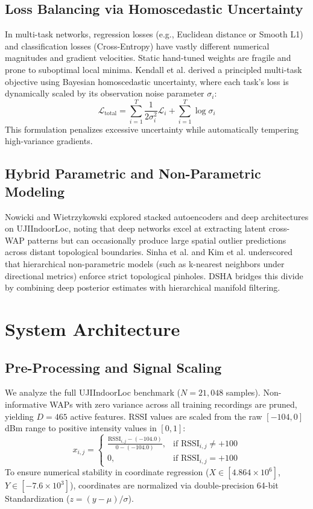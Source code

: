 \documentclass[conference]{IEEEtran}
\begin{document}
\subsection{Loss Balancing via Homoscedastic Uncertainty}
In multi-task networks, regression losses (e.g., Euclidean distance or Smooth L1) and classification losses (Cross-Entropy) have vastly different numerical magnitudes and gradient velocities. Static hand-tuned weights are fragile and prone to suboptimal local minima. Kendall et al. \cite{kendall2018} derived a principled multi-task objective using Bayesian homoscedastic uncertainty, where each task's loss is dynamically scaled by its observation noise parameter $\sigma_i$:
\begin{equation}
\mathcal{L}_{\text{total}} = \sum_{i=1}^{T} \frac{1}{2\sigma_i^2}\mathcal{L}_i + \sum_{i=1}^{T} \log \sigma_i
\end{equation}
This formulation penalizes excessive uncertainty while automatically tempering high-variance gradients.

\subsection{Hybrid Parametric and Non-Parametric Modeling}
Nowicki and Wietrzykowski \cite{nowicki2017} explored stacked autoencoders and deep architectures on UJIIndoorLoc, noting that deep networks excel at extracting latent cross-WAP patterns but can occasionally produce large spatial outlier predictions across distant topological boundaries. Sinha et al. \cite{sinha2022} and Kim et al. \cite{kim2018} underscored that hierarchical non-parametric models (such as k-nearest neighbors under directional metrics) enforce strict topological pinholes. DSHA bridges this divide by combining deep posterior estimates with hierarchical manifold filtering.

\section{System Architecture}

\subsection{Pre-Processing and Signal Scaling}
We analyze the full UJIIndoorLoc benchmark ($N=21,048$ samples). Non-informative WAPs with zero variance across all training recordings are pruned, yielding $D=465$ active features. RSSI values are scaled from the raw $[ -104, 0 ]$\,dBm range to positive intensity values in $[0, 1]$:
\begin{equation}
x_{i,j} = \begin{cases} 
\frac{\text{RSSI}_{i,j} - (-104.0)}{0 - (-104.0)}, & \text{if } \text{RSSI}_{i,j} \neq +100 \\
0, & \text{if } \text{RSSI}_{i,j} = +100
\end{cases}
\end{equation}
To ensure numerical stability in coordinate regression ($X \in [4.864\times 10^6]$, $Y \in [-7.6\times 10^3]$), coordinates are normalized via double-precision 64-bit Standardization ($z = (y - \mu)/\sigma$).
\end{document}
